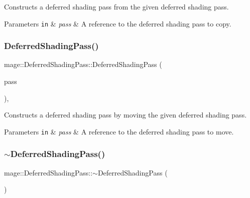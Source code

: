 Constructs a deferred shading pass from the given deferred shading pass.


\begin{DoxyParams}[1]{Parameters}
\mbox{\tt in}  & {\em pass} & A reference to the deferred shading pass to copy. \\
\hline
\end{DoxyParams}
\hypertarget{classmage_1_1_deferred_shading_pass_aa34329a39de6cf3a748244b52f1f29a0}{}\label{classmage_1_1_deferred_shading_pass_aa34329a39de6cf3a748244b52f1f29a0} 
\subsubsection{\texorpdfstring{Deferred\+Shading\+Pass()}{DeferredShadingPass()}\hspace{0.1cm}{\footnotesize\ttfamily [3/3]}}
{\footnotesize\ttfamily mage\+::\+Deferred\+Shading\+Pass\+::\+Deferred\+Shading\+Pass (\begin{DoxyParamCaption}\item[{\hyperlink{classmage_1_1_deferred_shading_pass}{Deferred\+Shading\+Pass} \&\&}]{pass }\end{DoxyParamCaption})\hspace{0.3cm}{\ttfamily [default]}, {\ttfamily [noexcept]}}

Constructs a deferred shading pass by moving the given deferred shading pass.


\begin{DoxyParams}[1]{Parameters}
\mbox{\tt in}  & {\em pass} & A reference to the deferred shading pass to move. \\
\hline
\end{DoxyParams}
\hypertarget{classmage_1_1_deferred_shading_pass_a0feba3a73c56e1c07abe19fddd890f76}{}\label{classmage_1_1_deferred_shading_pass_a0feba3a73c56e1c07abe19fddd890f76} 
\subsubsection{\texorpdfstring{$\sim$\+Deferred\+Shading\+Pass()}{~DeferredShadingPass()}}
{\footnotesize\ttfamily mage\+::\+Deferred\+Shading\+Pass\+::$\sim$\+Deferred\+Shading\+Pass (\begin{DoxyParamCaption}{ }\end{DoxyParamCaption})\hspace{0.3cm}{\ttfamily [default]}}

